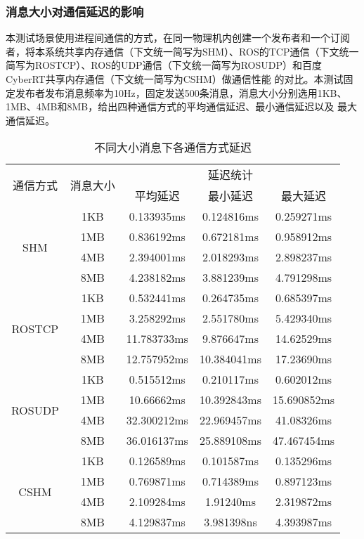 \subsubsection{消息大小对通信延迟的影响}
本测试场景使用进程间通信的方式，在同一物理机内创建一个发布者和一个订阅者，将本系统共享内存通信（下文统一简写为SHM）、ROS的TCP通信（下文统一简写为ROSTCP）、ROS的UDP通信（下文统一简写为ROSUDP）和百度CyberRT共享内存通信（下文统一简写为CSHM）做通信性能
的对比。本测试固定发布者发布消息频率为10Hz，固定发送500条消息，消息大小分别选用1KB、1MB、4MB和8MB，给出四种通信方式的平均通信延迟、最小通信延迟以及
最大通信延迟。
\begin{table}[htb]
  \centering\small
  \caption{不同大小消息下各通信方式延迟}
  \renewcommand\arraystretch{1.2}
  \label{one_to_one}
  \begin{tabular}{ccccc}
    \toprule
    \multirow{2}{*}{通信方式} & \multirow{2}{*}{消息大小} & \multicolumn{3}{c}{延迟统计}\\
     & & 平均延迟 & 最小延迟 & 最大延迟\\
    \midrule
    \multirow{4}{*}{SHM} & 1KB& 0.133935ms& 0.124816ms& 0.259271ms\\ & 1MB & 0.836192ms & 0.672181ms & 0.958912ms \\ & 4MB & 2.394001ms & 2.018293ms & 2.898237ms \\ & 8MB & 4.238182ms & 3.881239ms & 4.791298ms\\
    \hline
    \multirow{4}{*}{ROSTCP} & 1KB& 0.532441ms& 0.264735ms& 0.685397ms\\ & 1MB & 3.258292ms & 2.551780ms & 5.429340ms \\ & 4MB & 11.783733ms & 9.876647ms & 14.62529ms \\ & 8MB & 12.757952ms & 10.384041ms & 17.23690ms\\
    \hline
    \multirow{4}{*}{ROSUDP} & 1KB& 0.515512ms& 0.210117ms& 0.602012ms\\ & 1MB & 10.66662ms & 10.392843ms & 15.690852ms \\ & 4MB & 32.300212ms & 22.969457ms & 41.08326ms \\ & 8MB & 36.016137ms & 25.889108ms & 47.467454ms\\
    \hline
    \multirow{4}{*}{CSHM} & 1KB& 0.126589ms& 0.101587ms& 0.135296ms\\ & 1MB & 0.769871ms & 0.714389ms & 0.897123ms \\ & 4MB & 2.109284ms & 1.91240ms & 2.319872ms \\ & 8MB & 4.129837ms & 3.981398ns & 4.393987ms\\
    \bottomrule
  \end{tabular}
\end{table}

